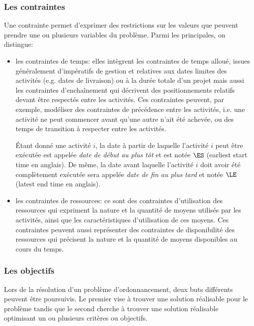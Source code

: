 \subsubsection{Les contraintes}

Une contrainte permet d'exprimer des restrictions sur les valeurs que
peuvent prendre une ou plusieurs variables du problème. Parmi les
principales, on distingue:
\begin{itemize}
\item les contraintes de temps: elles intègrent les contraintes de
  temps alloué, issues généralement d'impératifs de gestion et
  relatives aux dates limites des activités (e.g. dates
    de livraison) ou à la durée totale d'un projet mais aussi les
    contraintes d'enchaînement qui décrivent des
    positionnements relatifs devant être respectés entre les
    activités. Ces contraintes peuvent, par exemple, modéliser des
    contraintes de précédence entre les activités, i.e. une activité
    ne peut commencer avant qu'une autre n'ait été achevée, ou des temps
    de transition à respecter entre les activités.

    {\'E}tant donné une activité $i$, la date à partir de laquelle
    l'activité $i$ peut être exécutée est appelée {\it date de début au
      plus tôt} et est notée $\ES$ (earliest start time en anglais). De
    même, la date avant laquelle l'activité $i$ doit avoir été
    complètement exécutée sera appelée {\it date de fin au plus tard} et
    notée $\LE$ (latest end time en anglais).

\item les contraintes de ressources:  ce sont des contraintes d'utilisation
  des ressources qui expriment la nature et la quantité de moyens
  utilisés par les activités, ainsi que les caractéristiques
  d'utilisation de ces moyens. Ces contraintes peuvent aussi représenter
  des contraintes de disponibilité des ressources qui précisent la
  nature et la quantité de moyens disponibles au cours du temps.
\end{itemize}

\subsubsection{Les objectifs}

Lors de la résolution d'un problème d'ordonnancement, deux buts
différents peuvent être poursuivis. Le premier vise à trouver une solution
réalisable pour le problème tandis que le second cherche à trouver une
solution réalisable optimisant un ou plusieurs critères ou objectifs.

